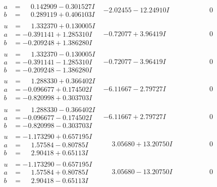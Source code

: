 \documentclass[1p]{elsarticle_modified}
\theoremstyle{definition}
\begin{document}
$$\begin{array}{c|c|c}
\begin{aligned}
a &= \phantom{-}0.142909 - 0.301527 I \\
b &= \phantom{-}0.289119 + 0.406103 I\end{aligned}
 & -2.02455 - 12.24910 I & \phantom{-0.000000 } 0 \\ \hline\begin{aligned}
u &= \phantom{-}1.332370 + 0.130005 I \\
a &= -0.391141 + 1.285310 I \\
b &= -0.209248 + 1.386280 I\end{aligned}
 & -0.72077 + 3.96419 I & \phantom{-0.000000 } 0 \\ \hline\begin{aligned}
u &= \phantom{-}1.332370 - 0.130005 I \\
a &= -0.391141 - 1.285310 I \\
b &= -0.209248 - 1.386280 I\end{aligned}
 & -0.72077 - 3.96419 I & \phantom{-0.000000 } 0 \\ \hline\begin{aligned}
u &= \phantom{-}1.288330 + 0.366402 I \\
a &= -0.096677 + 0.174502 I \\
b &= -0.820998 + 0.303703 I\end{aligned}
 & -6.11667 - 2.79727 I & \phantom{-0.000000 } 0 \\ \hline\begin{aligned}
u &= \phantom{-}1.288330 - 0.366402 I \\
a &= -0.096677 - 0.174502 I \\
b &= -0.820998 - 0.303703 I\end{aligned}
 & -6.11667 + 2.79727 I & \phantom{-0.000000 } 0 \\ \hline\begin{aligned}
u &= -1.173290 + 0.657195 I \\
a &= \phantom{-}1.57584 - 0.80785 I \\
b &= \phantom{-}2.90418 + 0.65113 I\end{aligned}
 & \phantom{-}3.05680 + 13.20750 I & \phantom{-0.000000 } 0 \\ \hline\begin{aligned}
u &= -1.173290 - 0.657195 I \\
a &= \phantom{-}1.57584 + 0.80785 I \\
b &= \phantom{-}2.90418 - 0.65113 I\end{aligned}
 & \phantom{-}3.05680 - 13.20750 I & \phantom{-0.000000 } 0 \\ \hline\begin{aligned}

\end{aligned}
\end{array}$$
\end{document}
